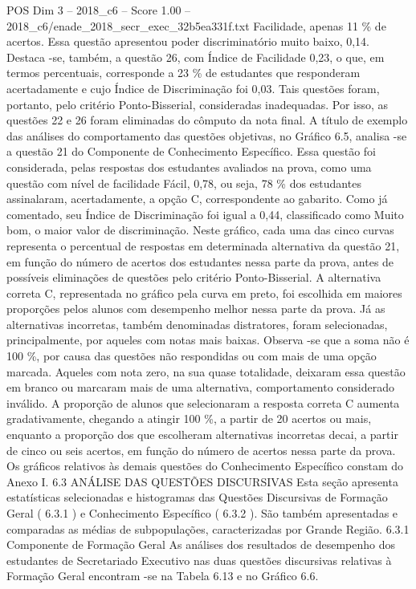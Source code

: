 \begin{textsample}{POS Dim 3 – 2018\_c6 – Score 1.00 – 2018\_c6/enade\_2018\_secr\_exec\_32b5ea331f.txt}
Facilidade, apenas 11 \% de acertos.
Essa questão apresentou poder discriminatório muito baixo, 0,14.
Destaca -se, também, a questão 26, com Índice de Facilidade 0,23, o que, em termos percentuais, corresponde a 23 \% de estudantes que responderam acertadamente e cujo Índice de Discriminação foi 0,03.
Tais questões foram, portanto, pelo critério Ponto-Bisserial, consideradas inadequadas.
Por isso, as questões 22 e 26 foram eliminadas do cômputo da nota final.
A título de exemplo das análises do comportamento das questões objetivas, no Gráfico 6.5, analisa -se a questão 21 do Componente de Conhecimento Específico.
Essa questão foi considerada, pelas respostas dos estudantes avaliados na prova, como uma questão com nível de facilidade Fácil, 0,78, ou seja, 78 \% dos estudantes assinalaram, acertadamente, a opção C, correspondente ao gabarito.
Como já comentado, seu Índice de Discriminação foi igual a 0,44, classificado como Muito bom, o maior valor de discriminação.
Neste gráfico, cada uma das cinco curvas representa o percentual de respostas em determinada alternativa da questão 21, em função do número de acertos dos estudantes nessa parte da prova, antes de possíveis eliminações de questões pelo critério Ponto-Bisserial.
A alternativa correta C, representada no gráfico pela curva em preto, foi escolhida em maiores proporções pelos alunos com desempenho melhor nessa parte da prova.
Já as alternativas incorretas, também denominadas distratores, foram selecionadas, principalmente, por aqueles com notas mais baixas.
Observa -se que a soma não é 100 \%, por causa das questões não respondidas ou com mais de uma opção marcada.
Aqueles com nota zero, na sua quase totalidade, deixaram essa questão em branco ou marcaram mais de uma alternativa, comportamento considerado inválido.
A proporção de alunos que selecionaram a resposta correta C aumenta gradativamente, chegando a atingir 100 \%, a partir de 20 acertos ou mais, enquanto a proporção dos que escolheram alternativas incorretas decai, a partir de cinco ou seis acertos, em função do número de acertos nessa parte da prova.
Os gráficos relativos às demais questões do Conhecimento Específico constam do Anexo I. 6.3 ANÁLISE DAS QUESTÕES DISCURSIVAS Esta seção apresenta estatísticas selecionadas e histogramas das Questões Discursivas de Formação Geral ( 6.3.1 ) e Conhecimento Específico ( 6.3.2 ).
São também apresentadas e comparadas as médias de subpopulações, caracterizadas por Grande Região. 6.3.1 Componente de Formação Geral As análises dos resultados de desempenho dos estudantes de Secretariado Executivo nas duas questões discursivas relativas à Formação Geral encontram -se na Tabela 6.13 e no Gráfico 6.6.

\end{textsample}
